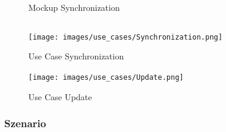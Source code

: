 \begin{figure}[h]
	\centering
	\qquad
	\caption{Mockup Synchronization}
\end{figure}
\newpage
\begin{verbatim}
\end{verbatim}
\begin{figure}[h]
	\begin{center}
		\texttt{[image: images/use\_cases/Synchronization.png]}
	\end{center}
	\caption{Use Case Synchronization}
	\label{fig:UC_Synchronization}
\end{figure}
\begin{figure}[h]
	\begin{center}
		\texttt{[image: images/use\_cases/Update.png]}
	\end{center}
	\caption{Use Case Update}
	\label{fig:UC_Update}
\end{figure}

\newpage
\subsubsection{Szenario}

